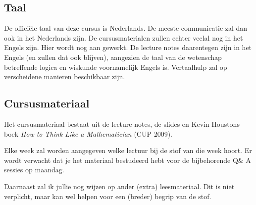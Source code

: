 
\subsection*{Taal}
\label{sec:language}

De officiële taal van deze cursus is Nederlands. De meeste communicatie zal dan ook in het Nederlands zijn. De cursusmaterialen zullen echter veelal nog in het Engels zijn. Hier wordt nog aan gewerkt. De lecture notes daarentegen zijn in het Engels (en zullen dat ook blijven), aangezien de taal van de wetenschap betreffende logica en wiskunde voornamelijk Engels is. Vertaalhulp zal op verscheidene manieren beschikbaar zijn. 
 
\subsection*{Cursusmateriaal}

Het cursusmateriaal bestaat uit de lecture notes, de slides en Kevin Houstons boek \emph{How to Think Like a Mathematician} (CUP 2009).%

Elke week zal worden aangegeven welke lectuur bij de stof van die week hoort. Er wordt verwacht dat je het materiaal bestudeerd hebt voor de bijbehorende Q\& A sessies op maandag.

Daarnaast zal ik jullie nog wijzen op ander (extra) leesmateriaal. Dit is niet verplicht, maar kan wel helpen voor een (breder) begrip van de stof.  


